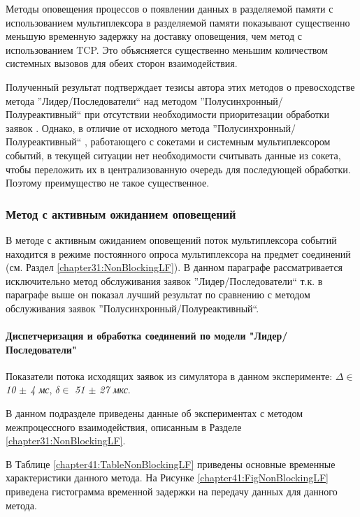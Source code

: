 Методы оповещения процессов о появлении данных в разделяемой памяти с использованием мультиплексора в разделяемой памяти показывают существенно меньшую временную задержку на доставку оповещения, чем метод с использованием TCP. Это объясняется существенно меньшим количеством системных вызовов для обеих сторон взаимодействия.

Полученный результат подтверждает тезисы автора этих методов о превосходстве метода ''Лидер/Последователи`` над методом ''Полусинхронный/Полуреактивный`` при отсутствии необходимости приоритезации обработки заявок \cite[398]{schmidt2013pattern}. Однако, в отличие от исходного метода ''Полусинхронный/Полуреактивный`` \cite[375]{schmidt2013pattern}, работающего с сокетами и системным мультиплексором событий, в текущей ситуации нет необходимости считывать данные из сокета, чтобы переложить их в централизованную очередь для последующей обработки. Поэтому преимущество не такое существенное.

\subsubsection{Метод с активным ожиданием оповещений}

В методе с активным ожиданием оповещений поток мультиплексора событий находится в режиме постоянного опроса мультиплексора на предмет соединений (см. Раздел \ref{chapter31:NonBlockingLF}). В данном параграфе рассматривается исключительно метод обслуживания заявок ''Лидер/Последователи`` т.к. в параграфе выше он показал лучший результат по сравнению с методом обслуживания заявок ''Полусинхронный/Полуреактивный``.

\paragraph{Диспетчеризация и обработка соединений по модели "Лидер/Последователи"}

Показатели потока исходящих заявок из симулятора в данном эксперименте: $\Delta \in$ \textit{10 $\pm$ 4 мс}, $\delta \in$ \textit{51 $\pm$ 27 мкс}.

В данном подразделе приведены данные об экспериментах с методом межпроцессного взаимодействия, описанным в Разделе \ref{chapter31:NonBlockingLF}.

В Таблице \ref{chapter41:TableNonBlockingLF} приведены основные временные характеристики данного метода. На Рисунке \ref{chapter41:FigNonBlockingLF} приведена гистограмма временной задержки на передачу данных для данного метода.

